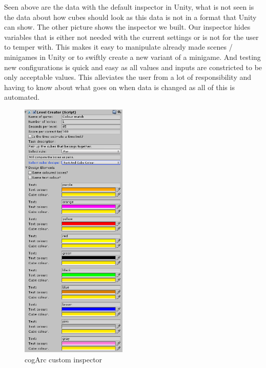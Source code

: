 Seen above are the data with the default inspector in Unity, what is not seen is the data about how cubes should look as this data 
is not in a format that Unity can show.
The other picture shows the inspector we built. 
Our inspector hides variables that is either not needed with the current settings or is not for the user to temper with.
This makes it easy to manipulate already made scenes / minigames in Unity or to swiftly create a new variant of a minigame.
And testing new configurations is quick and easy as all values and inputs are constricted to be only acceptable values.
This alleviates the user from a lot of responsibility and having to know about what goes on when data is changed as all of this is automated.

\begin{figure}
	\capstart
	\vspace{-30pt}
	\includegraphics[width=0.45\textwidth]{images/inspector_edited.png}
	\caption{cogArc custom inspector}
	\label{fig:inspector_edited}
	\vspace{-15pt}
\end{figure}
